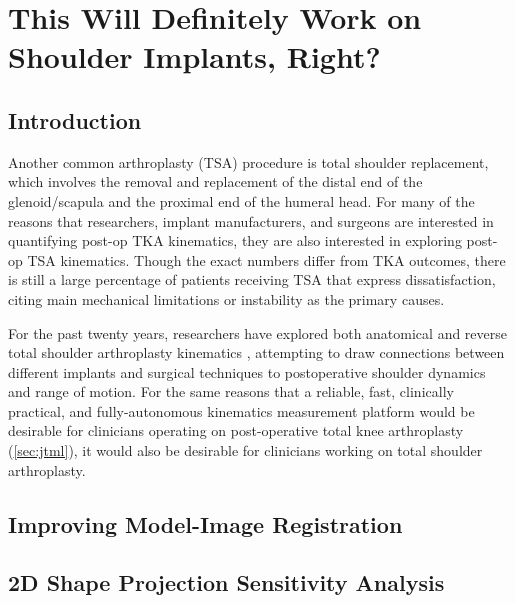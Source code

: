  \chapter{This Will Definitely Work on Shoulder Implants, Right?}

\section{Introduction}
Another common arthroplasty (TSA) procedure is total shoulder replacement, which involves the removal and replacement of the distal end of the glenoid/scapula and the proximal end of the humeral head.
For many of the reasons that researchers, implant manufacturers, and surgeons are interested in quantifying post-op TKA kinematics, they are also interested in exploring post-op TSA kinematics.
Though the exact numbers differ from TKA outcomes, there is still a large percentage of patients receiving TSA that express dissatisfaction, citing main mechanical limitations or instability as the primary causes.

For the past twenty years, researchers have explored both anatomical and reverse total shoulder arthroplasty kinematics \cite{kijimaVivo3dimensionalAnalysis2015,matsukiVivo3DAnalysis2014,matsukiDynamicVivoGlenohumeral2012,sugiComparingVivoThreedimensional2021,burtonFullyAutomaticTracking2023}, attempting to draw connections between different implants and surgical techniques to postoperative shoulder dynamics and range of motion.
For the same reasons that a reliable, fast, clinically practical, and fully-autonomous kinematics measurement platform would be desirable for clinicians operating on post-operative total knee arthroplasty (\cref{sec:jtml}), it would also be desirable for clinicians working on total shoulder arthroplasty.


\section{Improving Model-Image Registration}

\section{2D Shape Projection Sensitivity Analysis}



